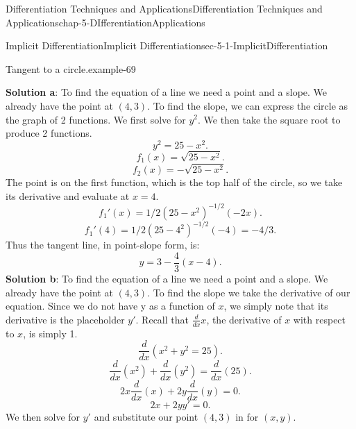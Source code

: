 \documentclass[oneside,10pt,]{book}
\newcommand{\terminology}[1]{\textbf{#1}}
\numberwithin{equation}{section}
\begin{document}
\begin{chapterptx}{Differentiation Techniques and Applications}{}{Differentiation Techniques and Applications}{}{}{chap-5-DIfferentiationApplications}
\begin{sectionptx}{Implicit Differentiation}{}{Implicit Differentiation}{}{}{sec-5-1-ImplicitDifferentiation}
\begin{example}{Tangent to a circle.}{example-69}
\par
\hypertarget{p-1865}{}%
\terminology{Solution a}: To find the equation of a line we need a point and a slope.  We already have the point at \((4,3)\).  To find the slope, we can express the circle as the graph of 2 functions.   We first solve for \(y^2\).  We then take the square root to produce 2 functions.%
%
\begin{equation*}
y^2=25-x^2.
\end{equation*}
%
\begin{equation*}
f_1 (x)=\sqrt{25-x^2 }.
\end{equation*}
%
\begin{equation*}
f_2 (x)=-\sqrt{25-x^2 }.
\end{equation*}
\hypertarget{p-1866}{}%
The point is on the first function, which is the top half of the circle, so we take its derivative and evaluate at \(x=4\).%
%
\begin{equation*}
f_1' (x)=1/2 (25-x^2 )^{-1/2} (-2x).
\end{equation*}
%
\begin{equation*}
f_1' (4)=1/2 (25-4^2 )^{-1/2} (-4)=-4/3.
\end{equation*}
\hypertarget{p-1867}{}%
Thus the tangent line, in point-slope form, is:%
%
\begin{equation*}
y=3-\frac{4}{3} (x-4).
\end{equation*}
\hypertarget{p-1868}{}%
\terminology{Solution b}: To find the equation of a line we need a point and a slope.  We already have the point at \((4,3)\).  To find the slope we take the derivative of our equation.  Since we do not have y as a function of \(x\), we simply note that its derivative is the placeholder \(y'\).  Recall that \(\frac{d}{dx} x\), the derivative of \(x\) with respect to \(x\), is simply 1.%
%
\begin{equation*}
\frac{d}{dx}(x^2+y^2=25).
\end{equation*}
%
\begin{equation*}
\frac{d}{dx}(x^2)+\frac{d}{dx}(y^2)=\frac{d}{dx}(25).
\end{equation*}
%
\begin{equation*}
2x \frac{d}{dx}(x)+2y \frac{d}{dx}(y)=0.
\end{equation*}
%
\begin{equation*}
2x+2y y'=0.
\end{equation*}
\hypertarget{p-1869}{}%
We then solve for \(y'\) and substitute our point \((4,3)\) in for \((x,y)\).%
%
\begin{equation*}

\end{equation*}
\end{example}
\end{sectionptx}
\end{chapterptx}
\end{document}

